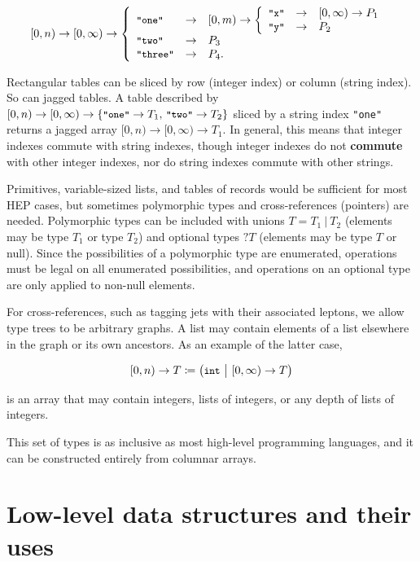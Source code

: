 \documentclass{webofc}
\begin{document}
\vspace{-\baselineskip}
\[ [0, n) \to [0, \infty) \to \left\{\begin{array}{l c l}
\mbox{\small\tt "one"} & \to & [0, m) \to \left \{\begin{array}{l c l} \mbox{\small\tt "x"} & \to & [0, \infty) \to P_1 \\ \mbox{\small\tt "y"} & \to & P_2 \end{array}\right. \\
\mbox{\small\tt "two"} & \to & P_3 \\
\mbox{\small\tt "three"} & \to & P_4\mbox{.} \end{array}\right. \]

Rectangular tables can be sliced by row (integer index) or column (string index). So can jagged tables. A table described by $[0, n) \to [0, \infty) \to \{\mbox{\small\tt "one"} \to T_1\mbox{, }\mbox{\small\tt "two"} \to T_2\}$ sliced by a string index {\small\tt "one"} returns a jagged array $[0, n) \to [0, \infty) \to T_1$. In general, this means that integer indexes commute with string indexes, though integer indexes do not {\bf commute} with other integer indexes, nor do string indexes commute with other strings.

Primitives, variable-sized lists, and tables of records would be sufficient for most HEP cases, but sometimes polymorphic types and cross-references (pointers) are needed. Polymorphic types can be included with unions $T = T_1\ |\ T_2$ (elements may be type $T_1$ or type $T_2$) and optional types $?T$ (elements may be type $T$ or null). Since the possibilities of a polymorphic type are enumerated, operations must be legal on all enumerated possibilities, and operations on an optional type are only applied to non-null elements.

For cross-references, such as tagging jets with their associated leptons, we allow type trees to be arbitrary graphs. A list may contain elements of a list elsewhere in the graph or its own ancestors. As an example of the latter case,

\[ [0, n) \to T \coloneqq \big( \mbox{\small\tt int}\ \big|\ [0, \infty) \to T \big) \]

\noindent is an array that may contain integers, lists of integers, or any depth of lists of integers.

This set of types is as inclusive as most high-level programming languages, and it can be constructed entirely from columnar arrays.

\section{Low-level data structures and their uses}
\end{document}
